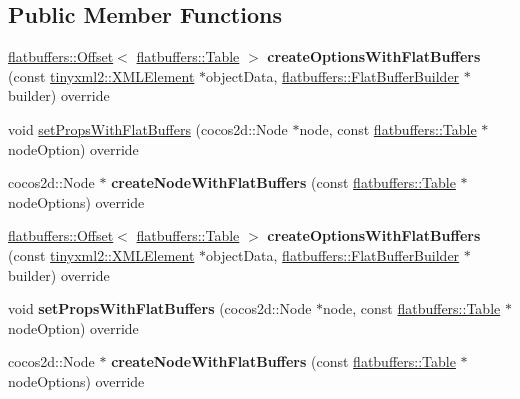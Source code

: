 \subsection*{Public Member Functions}
\begin{DoxyCompactItemize}
\item 
\mbox{\label{classTabHeaderReader_af632be90093dc6731d6c7efd2cb8c373}} 
\hyperlink{structflatbuffers_1_1Offset}{flatbuffers\+::\+Offset}$<$ \hyperlink{classflatbuffers_1_1Table}{flatbuffers\+::\+Table} $>$ {\bfseries create\+Options\+With\+Flat\+Buffers} (const \hyperlink{classtinyxml2_1_1XMLElement}{tinyxml2\+::\+X\+M\+L\+Element} $\ast$object\+Data, \hyperlink{classflatbuffers_1_1FlatBufferBuilder}{flatbuffers\+::\+Flat\+Buffer\+Builder} $\ast$builder) override
\item 
void \hyperlink{classTabHeaderReader_a856933949dd39261b44129db1e572e8d}{set\+Props\+With\+Flat\+Buffers} (cocos2d\+::\+Node $\ast$node, const \hyperlink{classflatbuffers_1_1Table}{flatbuffers\+::\+Table} $\ast$node\+Option) override
\item 
\mbox{\label{classTabHeaderReader_adf14161842572fb8a86bd5774ea92004}} 
cocos2d\+::\+Node $\ast$ {\bfseries create\+Node\+With\+Flat\+Buffers} (const \hyperlink{classflatbuffers_1_1Table}{flatbuffers\+::\+Table} $\ast$node\+Options) override
\item 
\mbox{\label{classTabHeaderReader_a01caed128a0208612445264f39f76683}} 
\hyperlink{structflatbuffers_1_1Offset}{flatbuffers\+::\+Offset}$<$ \hyperlink{classflatbuffers_1_1Table}{flatbuffers\+::\+Table} $>$ {\bfseries create\+Options\+With\+Flat\+Buffers} (const \hyperlink{classtinyxml2_1_1XMLElement}{tinyxml2\+::\+X\+M\+L\+Element} $\ast$object\+Data, \hyperlink{classflatbuffers_1_1FlatBufferBuilder}{flatbuffers\+::\+Flat\+Buffer\+Builder} $\ast$builder) override
\item 
\mbox{\label{classTabHeaderReader_a856933949dd39261b44129db1e572e8d}} 
void {\bfseries set\+Props\+With\+Flat\+Buffers} (cocos2d\+::\+Node $\ast$node, const \hyperlink{classflatbuffers_1_1Table}{flatbuffers\+::\+Table} $\ast$node\+Option) override
\item 
\mbox{\label{classTabHeaderReader_a76ce3e5788d19951c85ab01603eed30c}} 
cocos2d\+::\+Node $\ast$ {\bfseries create\+Node\+With\+Flat\+Buffers} (const \hyperlink{classflatbuffers_1_1Table}{flatbuffers\+::\+Table} $\ast$node\+Options) override
\end{DoxyCompactItemize}
